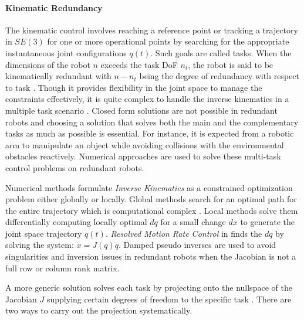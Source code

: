 \paragraph{Kinematic Redundancy}
The kinematic control involves reaching a reference point or tracking a trajectory in $SE(3)$ for one or more operational points by searching for the appropriate instantaneous joint configurations  $q(t)$. Such goals are called tasks. When the dimensions of the robot $n$ exceeds the task DoF $n_t$, the robot is said to be kinematically redundant with $n − n_t$ being the degree of redundancy with respect to task \cite{nakamura1990advanced}. Though it provides flexibility in the joint space to manage the constraints effectively, it is quite complex to handle the inverse kinematics in a multiple task scenario \cite{siciliano1991general}. Closed form solutions are not possible in redundant robots and choosing a solution that solves both the main and the complementary tasks as much as possible is essential. For instance, it is expected from a robotic arm to manipulate an object while avoiding collisions with the environmental obstacles reactively. Numerical approaches are used to solve these multi-task control problems on redundant robots.

Numerical methods formulate \textit{Inverse Kinematics} as a constrained optimization problem either globally or locally. Global methods search for an optimal path for the entire trajectory which is computational complex \cite{baillieul1990resolution}. Local methods solve them differentially computing locally optimal $dq$ for a small change $dx$ to generate the joint space trajectory $q(t)$. \textit{Resolved Motion Rate Control} in \cite{Whitney1969} finds the $dq$ by solving the system: $\dot{x} = J(q) \dot{q}$. Damped pseudo inverses \cite{nakamura1986inverse} are used to avoid singularities and inversion issues in redundant robots when the Jacobian is not a full row or column rank matrix. 

 A more generic solution solves each task by projecting onto the nullspace of the Jacobian $J$ supplying certain degrees of freedom to the specific task \cite{Liegeois1977}. There are two ways to carry out the projection systematically.

